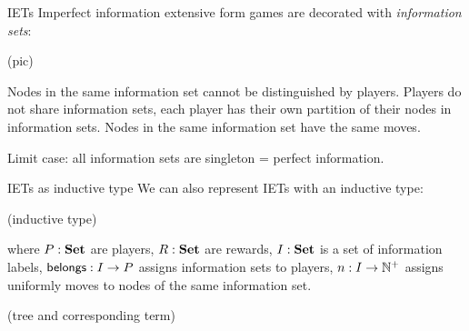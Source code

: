 \begin{frame}{IETs}
	Imperfect information extensive form games are decorated with \emph{information sets}:

	(pic)

	Nodes in the same information set cannot be distinguished by players. Players do not share information sets, each player has their own partition of their nodes in information sets. Nodes in the same information set have the same moves.

	Limit case: all information sets are singleton = perfect information.
\end{frame}

\begin{frame}{IETs as inductive type}
	We can also represent IETs with an inductive type:

	(inductive type)

	where $P : \mathbf{Set}$ are players, $R : \mathbf{Set}$ are rewards, $I : \mathbf{Set}$ is a set of information labels, $\mathsf{belongs} : I \to P$ assigns information sets to players, $n : I \to \mathbb{N}^+$ assigns uniformly moves to nodes of the same information set.

	(tree and corresponding term)
\end{frame}
